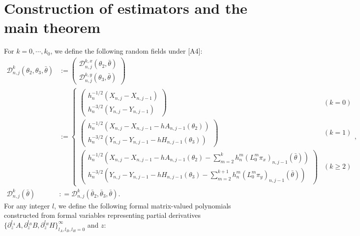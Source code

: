 \documentclass[a4paper,11pt]{jsarticle}
\begin{document}
\section{Construction of estimators and the main theorem}
For $k =0,\cdots, k_0$, we define the following random fields under [A4]:
\begin{align}
    \mathcal{D}^{k}_{n,j}(\theta_2,\theta_3,\bar{\theta}) &:= \begin{pmatrix}
    \mathcal{D}^{k,x}_{n,j}(\theta_2,\bar{\theta}) \\ \mathcal{D}^{k,y}_{n,j}(\theta_3,\bar{\theta}) 
\end{pmatrix}\\
&:= \begin{cases}
    \begin{pmatrix}
        h_n^{-1/2}(X_{n,j} - X_{n,j-1}) \\
        h_n^{-3/2}(Y_{n,j} - Y_{n,j-1})
    \end{pmatrix} & (k = 0) \\[2ex]
    \begin{pmatrix}
        h_n^{-1/2}(X_{n,j} - X_{n,j-1} - hA_{n,j-1}(\theta_2)) \\
        h_n^{-3/2}(Y_{n,j} - Y_{n,j-1} - hH_{n,j-1}(\theta_3))
    \end{pmatrix} & (k = 1) \\[2ex]
    \begin{pmatrix}
        h_n^{-1/2}(X_{n,j} - X_{n,j-1} - hA_{n,j-1}(\theta_2) - \sum_{m=2}^k h_n^m(L_0^m\pi_x)_{n,j-1}(\bar{\theta})) \\
        h_n^{-3/2}(Y_{n,j} - Y_{n,j-1} - hH_{n,j-1}(\theta_3) - \sum_{m=2}^{k+1}h_n^m(L_0^m\pi_y)_{n,j-1}(\bar{\theta}))
    \end{pmatrix} & (k \geq 2)
\end{cases}, \\ \mathcal{D}_{n,j}^k(\bar{\theta})&: =     \mathcal{D}^{k}_{n,j}(\bar{\theta}_2,\bar{\theta}_3,\bar{\theta}).
\end{align}
For any integer $l$, we define the following formal matrix-valued polynomials constructed from formal variables representing partial derivatives $\{\partial_z^{l_A} A, \partial_z^{l_B} B, \partial_z^{l_H} H\}_{l_A,l_B,l_H =0}^{\infty}$ and $z$:
\end{document}
